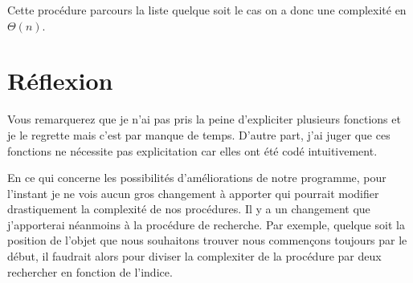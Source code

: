 \documentclass[a4paper, 12pt, leqno]{report}
\theoremstyle{plain}
\begin{document}
                Cette procédure parcours la liste quelque soit le cas on a donc une complexité en $\Theta(n)$.   
                
                \newpage
                
          \chapter{R\'eflexion}	
          
          Vous remarquerez que je n'ai pas pris la peine d'expliciter plusieurs fonctions et je le regrette mais c'est par manque de temps. D'autre part, j'ai juger que ces fonctions ne nécessite pas explicitation car elles ont été codé intuitivement. 
          
          En ce qui concerne les possibilités d'améliorations de notre programme, pour l'instant je ne vois aucun gros changement à apporter qui pourrait modifier drastiquement la complexité de nos procédures. Il y a un changement que j'apporterai néanmoins à la procédure de recherche. Par exemple, quelque soit la position de l'objet que nous souhaitons trouver nous commençons toujours par le début, il faudrait alors pour diviser la complexiter de la procédure par deux rechercher en fonction de l'indice.	                                    
\end{document}
